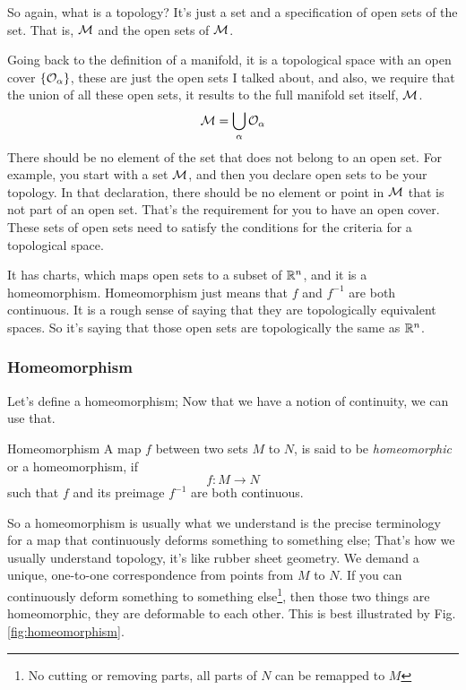 			So again, what is a topology? It's just a set and a specification of open sets of the set. That is, $\mathcal M$ and the open sets of $\mathcal M$. 

			Going back to the definition of a manifold, it is a topological space with an open cover $\qty{\mathcal{O}_\alpha}$, these are just the open sets
			I talked about, and also, we require that the union of all these open sets, it results to the full manifold set itself, $\mathcal M$. 
			\begin{equation}
				\label{eq:union-of-opensets}
				\mathcal{M} = \bigcup_\alpha \mathcal O_\alpha
			\end{equation}
			There should be no element of the set that does not belong to an open set. For example, you start with a set $\mathcal M$, and then you 
			declare open sets to be your topology. In that declaration, there should be no element or point in $\mathcal M$ that is not part of an open set. That's
			the requirement for you to have an open cover. These sets of open sets need to satisfy the conditions for the criteria for a topological space.
		
			It has charts, which maps open sets to a subset of $\mathbb{R}^n$, and it is a homeomorphism. Homeomorphism just means that $f$ and $f^{-1}$ are both continuous. It is
			a rough sense of saying that they are topologically equivalent spaces. So it's saying that those open sets are topologically the same as $\mathbb{R}^n$.
	\subsubsection{Homeomorphism}

		Let's define a homeomorphism; Now that we have a notion of continuity, we can use that.
		\begin{definition}{Homeomorphism}
			A map $f$ between two sets $M$ to $N$, is said to be \textit{homeomorphic} or a homeomorphism, if 
			\[
				f:M\to N
			\]
			such that $f$ and its preimage $f^{-1}$ are both continuous. 
		\end{definition}
		So a homeomorphism is usually what we understand is the precise terminology for a map that continuously 
		deforms something to something else; That's how we usually understand topology, it's like rubber sheet geometry. We demand a unique, one-to-one correspondence from points from $M$ to $N$.
		If you can continuously deform something to something else\footnote{No cutting or removing parts, all parts of $N$ can be remapped to $M$},
		then those two things are homeomorphic, they are deformable to each other. This is best illustrated by Fig. \ref{fig:homeomorphism}.

